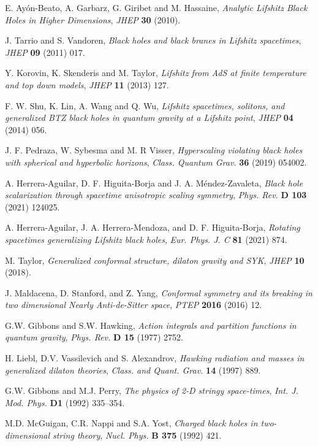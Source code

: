 \documentclass[sn-mathphys,Numbered]{sn-jnl}%
\theoremstyle{thmstyleone}%
\theoremstyle{thmstyletwo}%
\theoremstyle{thmstylethree}%
\begin{document}
\begin{thebibliography}{99}
E. Ayón-Beato, A. Garbarz, G. Giribet and M. Hassaine, \emph{Analytic Lifshitz Black Holes in
Higher Dimensions}, \emph{JHEP} {\bf30} (2010).

J. Tarrio  and S. Vandoren, \emph{Black holes and black branes in Lifshitz spacetimes}, \emph{JHEP}
{\bf09} (2011) 017.


Y. Korovin, K. Skenderis and M. Taylor,  \emph{Lifshitz from AdS at finite temperature and top
down models}, \emph{JHEP} {\bf 11} (2013) 127.

F. W. Shu, K. Lin, A. Wang and Q. Wu,  \emph{Lifshitz spacetimes, solitons, and generalized BTZ
black holes in quantum gravity at a Lifshitz point}, \emph{JHEP} {\bf04} (2014) 056.

J. F. Pedraza, W. Sybesma and M. R Visser, \emph{Hyperscaling violating black holes with spherical and hyperbolic horizons}, \emph{ Class. Quantum Grav.} {\bf 36} (2019) 054002.

A. Herrera-Aguilar, D. F. Higuita-Borja and J. A. Méndez-Zavaleta, \emph{Black hole scalarization through spacetime anisotropic scaling symmetry}, \emph{Phys. Rev.} {\bf D 103} (2021) 124025.

A. Herrera-Aguilar, J. A. Herrera-Mendoza, and D. F. Higuita-Borja, \emph{Rotating spacetimes generalizing Lifshitz black holes}, \emph{Eur. Phys. J. C} {\bf81} (2021) 874.

M. Taylor, \emph{Generalized conformal structure, dilaton gravity and SYK}, \emph{JHEP} {\bf 10} (2018).

 J. Maldacena, D. Stanford, and Z. Yang, \emph{Conformal symmetry and its breaking in two dimensional Nearly Anti-de-Sitter space}, \emph{PTEP} {\bf 2016}  (2016) 12.

 G.W. Gibbons and S.W. Hawking, \emph{Action integrals and partition functions in quantum
gravity}, \emph{Phys. Rev.} {\bf D 15}  (1977) 2752.

 H. Liebl, D.V. Vassilevich and S. Alexandrov, \emph{Hawking radiation and masses in generalized
dilaton theories}, \emph{Class. and Quant. Grav.} {\bf14} (1997) 889.

 G.W. Gibbons and M.J. Perry, \emph{The physics of 2-D stringy space-times}, \emph{Int. J. Mod. Phys.}
{\bf D1} (1992) 335–354.

 M.D. McGuigan, C.R. Nappi and S.A. Yost, \emph{Charged black holes in two-dimensional string theory}, \emph{Nucl. Phys.} {\bf B 375} (1992) 421.


\end{thebibliography}
\end{document}
